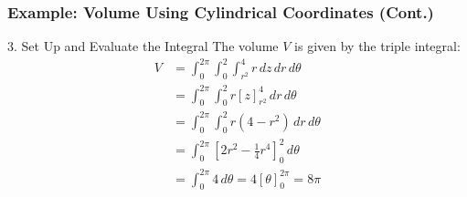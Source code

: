\documentclass[aspectratio=169, UTF8]{beamer}
\begin{document}
\begin{frame}
    \frametitle{Example: Volume Using Cylindrical Coordinates (Cont.)}

    \begin{block}{3. Set Up and Evaluate the Integral}
        The volume $V$ is given by the triple integral:
        \begin{align*}
            V & = \int_{0}^{2\pi} \int_{0}^{2} \int_{r^2}^{4} r \, dz \, dr \, d\theta    \\
              & = \int_{0}^{2\pi} \int_{0}^{2} r [z]_{r^2}^{4} \, dr \, d\theta           \\
              & = \int_{0}^{2\pi} \int_{0}^{2} r(4 - r^2) \, dr \, d\theta                \\
              & = \int_{0}^{2\pi} \left[ 2r^2 - \frac{1}{4}r^4 \right]_{0}^{2} \, d\theta \\
              & = \int_{0}^{2\pi} 4 \, d\theta = 4[\theta]_{0}^{2\pi} = 8\pi
        \end{align*}
    \end{block}

\end{frame}
\end{document}
